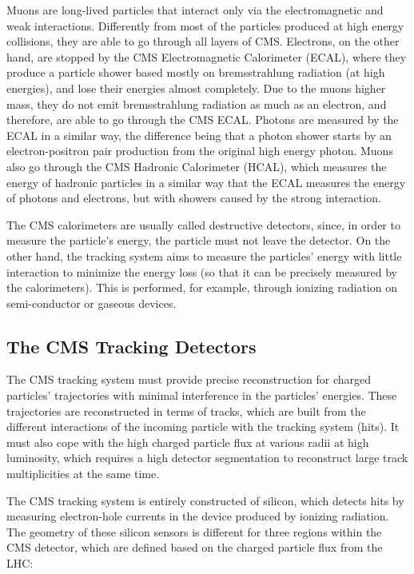 Muons are long-lived particles that interact only via the electromagnetic and weak interactions. 
Differently from most of the particles produced at high energy collisions, they are able to go through all layers of CMS. 
Electrons, on the other hand, are stopped by the CMS Electromagnetic Calorimeter (ECAL), where they produce a particle shower based mostly on bremsstrahlung radiation (at high energies), and lose their energies almost completely. 
Due to the muons higher mass, they do not emit bremsstrahlung radiation as much as an electron, and therefore, are able to go through the CMS ECAL. 
Photons are measured by the ECAL in a similar way, the difference being that a photon shower starts by an electron-positron pair production from the original high energy photon. 
Muons also go through the CMS Hadronic Calorimeter (HCAL), which measures the energy of hadronic particles in a similar way that the ECAL measures the energy of photons and electrons, but with showers caused by the strong interaction. 

The CMS calorimeters are usually called destructive detectors, since, in order to measure the particle's energy, the particle must not leave the detector.
On the other hand, the tracking system aims to measure the particles' energy with little interaction to minimize the energy loss (so that it can be precisely measured by the calorimeters). This is performed, for example, through ionizing radiation on semi-conductor or gaseous devices. 

\subsection{The CMS Tracking Detectors}

The CMS tracking system must provide precise reconstruction for charged particles' trajectories with minimal interference in the particles' energies. 
These trajectories are reconstructed in terms of tracks, which are built from the different interactions of the incoming particle with the tracking system (hits). 
It must also cope with the high charged particle flux at various radii at high luminosity, which requires a high detector segmentation to reconstruct large track multiplicities at the same time. 

The CMS tracking system is entirely constructed of silicon, which detects hits by measuring electron-hole currents in the device produced by ionizing radiation. 
The geometry of these silicon sensors is different for three regions within the CMS detector, which are defined based on the charged particle flux from the LHC:

